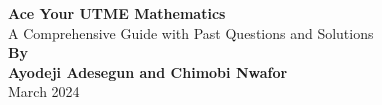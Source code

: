 \documentclass[a4paper]{book}
\begin{document}
\begin{titlingpage}
\centering
\vspace*{\fill}
\Huge\textbf{Ace Your UTME Mathematics}\\
\vspace{1cm}
\Large{A Comprehensive Guide with Past Questions and Solutions}\\
\vspace{2cm}
\Large\textbf{By}\\
\vspace{0.5cm}
\Large\textbf{Ayodeji Adesegun and Chimobi Nwafor}\\
\vspace{\fill}
\Large{March 2024}\\
\vspace*{\fill}
\end{titlingpage}
\end{document}
